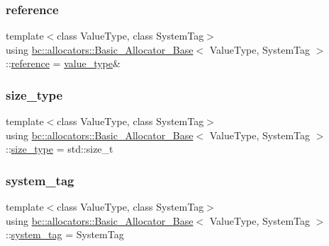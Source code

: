 \subsubsection{\texorpdfstring{reference}{reference}}
{\footnotesize\ttfamily template$<$class Value\+Type, class System\+Tag$>$ \\
using \hyperlink{structbc_1_1allocators_1_1Basic__Allocator__Base}{bc\+::allocators\+::\+Basic\+\_\+\+Allocator\+\_\+\+Base}$<$ Value\+Type, System\+Tag $>$\+::\hyperlink{structbc_1_1allocators_1_1Basic__Allocator__Base_a9900b1de8ba282c40f6b5c3576f39b35}{reference} =  \hyperlink{structbc_1_1allocators_1_1Basic__Allocator__Base_a7d9eca7878880a820908b57bdcb94501}{value\+\_\+type}\&}

\mbox{\label{structbc_1_1allocators_1_1Basic__Allocator__Base_ad7fe7255772b954d581c75ae2ee0d959}} 
\subsubsection{\texorpdfstring{size\+\_\+type}{size\_type}}
{\footnotesize\ttfamily template$<$class Value\+Type, class System\+Tag$>$ \\
using \hyperlink{structbc_1_1allocators_1_1Basic__Allocator__Base}{bc\+::allocators\+::\+Basic\+\_\+\+Allocator\+\_\+\+Base}$<$ Value\+Type, System\+Tag $>$\+::\hyperlink{structbc_1_1allocators_1_1Basic__Allocator__Base_ad7fe7255772b954d581c75ae2ee0d959}{size\+\_\+type} =  std\+::size\+\_\+t}

\mbox{\label{structbc_1_1allocators_1_1Basic__Allocator__Base_a625be36f2aedbec274f8524ac72c8d28}} 
\subsubsection{\texorpdfstring{system\+\_\+tag}{system\_tag}}
{\footnotesize\ttfamily template$<$class Value\+Type, class System\+Tag$>$ \\
using \hyperlink{structbc_1_1allocators_1_1Basic__Allocator__Base}{bc\+::allocators\+::\+Basic\+\_\+\+Allocator\+\_\+\+Base}$<$ Value\+Type, System\+Tag $>$\+::\hyperlink{structbc_1_1allocators_1_1Basic__Allocator__Base_a625be36f2aedbec274f8524ac72c8d28}{system\+\_\+tag} =  System\+Tag}

